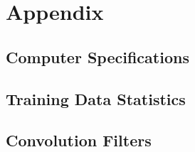 \section{Appendix}

\subsection{Computer Specifications}

\subsection{Training Data Statistics}\label{sec:B_stats}

\subsection{Convolution Filters}

